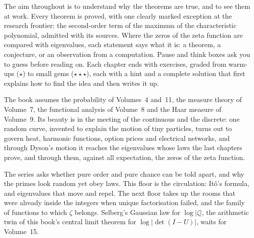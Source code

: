 The aim throughout is to understand why the theorems are true, and to see them at work. Every theorem is proved, with one
clearly marked exception at the research frontier: the second-order term of the maximum of the characteristic polynomial,
admitted with its sources. Where the zeros of the zeta function are compared with eigenvalues, each statement says what it is:
a theorem, a conjecture, or an observation from a computation. Pause and think boxes ask you to guess before reading on. Each
chapter ends with exercises, graded from warm-ups ($\star$) to small gems ($\star\star\star$), each with a hint and a complete
solution that first explains how to find the idea and then writes it up.

The book assumes the probability of Volumes~4 and~11, the measure theory of Volume~7, the functional analysis of Volume~8 and
the Haar measure of Volume~9. Its beauty is in the meeting of the continuous and the discrete: one random curve, invented to
explain the motion of tiny particles, turns out to govern heat, harmonic functions, option prices and electrical networks, and through Dyson's
motion it reaches the eigenvalues whose laws the last chapters prove, and through them, against all expectation, the zeros of
the zeta function.

The series asks whether pure order and pure chance can be told apart, and why the primes look random yet obey laws. This floor is
the circulation: It\^o's formula, and eigenvalues that move and repel. The next floor takes up the rooms that were already inside
the integers when unique factorisation failed, and the family of functions to which $\zeta$ belongs. Selberg's Gaussian law for
$\log|\zeta|$, the arithmetic twin of this book's central limit theorem for $\log|\det(I-U)|$, waits for Volume~15.
